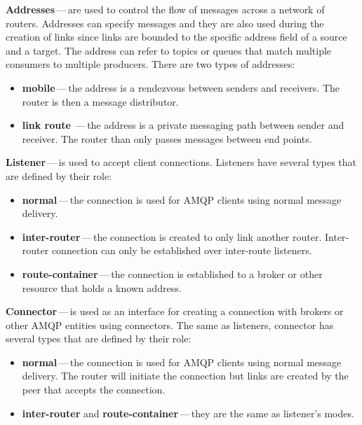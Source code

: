 \begin{description}
	\setlength\itemsep{0em}
	\item \textbf{Addresses\footnotemark{}}\,---\,are used to control the flow of messages across a network of routers. Addresses can specify messages and they are also used during the creation of links since links are bounded to the specific address field of a source and a target. The address can refer to topics or queues that match multiple consumers to multiple producers. There are two types of addresses:
	\begin{itemize}
		\setlength\itemsep{0em}
		\item \textbf{mobile}\,---\,the address is a rendezvous between senders and receivers. The router is then a message distributor.
		\item \textbf{link route}	\,---\,the address is a private messaging path between sender and receiver. The router than only passes messages between end points.
	\end{itemize}
	\item \textbf{Listener}\,---\,is used to accept client connections. Listeners have several types that are defined by their role:
	\begin{itemize}
		\setlength\itemsep{0em}
		\item \textbf{normal}\,---\,the connection is used for AMQP clients using normal message delivery.
		\item \textbf{inter-router}\,---\,the connection is created to only link another router. Inter-router connection can only be established over inter-route listeners.
		\item \textbf{route-container}\,---\,the connection is established to a broker or other resource that holds a known address.
	\end{itemize}
	\item \textbf{Connector}\,---\,is used as an interface for creating a connection with brokers or other AMQP entities using connectors. The same as listeners, connector has several types that are defined by their role:
	\begin{itemize}
		\setlength\itemsep{0em}
		\item \textbf{normal}\,---\,the connection is used for AMQP clients using normal message delivery. The router will initiate the connection but links are created by the peer that accepts the connection.
		\item \textbf{inter-router} and \textbf{route-container}\,---\,they are the same as listener's modes.
	\end{itemize}
\end{description}

